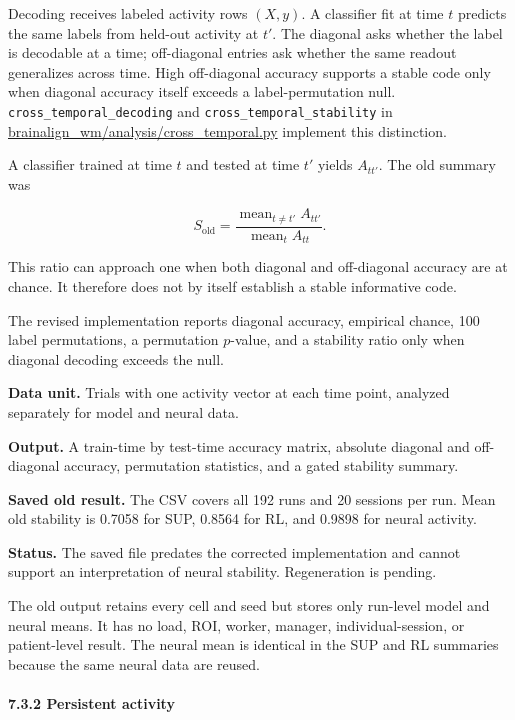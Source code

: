 \documentclass[
  10pt,
]{article}
\begin{document}
Decoding receives labeled activity rows \((X,y)\). A classifier fit at
time \(t\) predicts the same labels from held-out activity at \(t'\).
The diagonal asks whether the label is decodable at a time; off-diagonal
entries ask whether the same readout generalizes across time. High
off-diagonal accuracy supports a stable code only when diagonal accuracy
itself exceeds a label-permutation null.
\texttt{cross\_temporal\_decoding} and
\texttt{cross\_temporal\_stability} in
\url{brainalign_wm/analysis/cross_temporal.py} implement this
distinction.

A classifier trained at time \(t\) and tested at time \(t'\) yields
\(A_{tt'}\). The old summary was

\[
S_{\mathrm{old}}
=
\frac{\operatorname{mean}_{t\ne t'}A_{tt'}}
{\operatorname{mean}_t A_{tt}}.
\]

This ratio can approach one when both diagonal and off-diagonal accuracy
are at chance. It therefore does not by itself establish a stable
informative code.

The revised implementation reports diagonal accuracy, empirical chance,
100 label permutations, a permutation \(p\)-value, and a stability ratio
only when diagonal decoding exceeds the null.

\textbf{Data unit.} Trials with one activity vector at each time point,
analyzed separately for model and neural data.

\textbf{Output.} A train-time by test-time accuracy matrix, absolute
diagonal and off-diagonal accuracy, permutation statistics, and a gated
stability summary.

\textbf{Saved old result.} The CSV covers all 192 runs and 20 sessions
per run. Mean old stability is 0.7058 for SUP, 0.8564 for RL, and 0.9898
for neural activity.

\textbf{Status.} The saved file predates the corrected implementation
and cannot support an interpretation of neural stability. Regeneration
is pending.

The old output retains every cell and seed but stores only run-level
model and neural means. It has no load, ROI, worker, manager,
individual-session, or patient-level result. The neural mean is
identical in the SUP and RL summaries because the same neural data are
reused.

\hypertarget{persistent-activity}{%
\paragraph{7.3.2 Persistent activity}\label{persistent-activity}}
\end{document}
